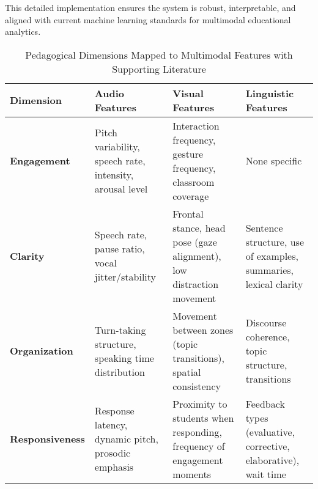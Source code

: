 This detailed implementation ensures the system is robust, interpretable, and aligned with current machine learning standards for multimodal educational analytics.

\sloppy %
\begin{table*}[htbp]
\centering
\renewcommand{\arraystretch}{1.5} %
\setlength{\tabcolsep}{8pt} %
\caption{Pedagogical Dimensions Mapped to Multimodal Features with Supporting Literature}
\begin{tabularx}{\textwidth}{|>{\raggedright\arraybackslash}X|>{\raggedright\arraybackslash}X|>{\raggedright\arraybackslash}X|>{\raggedright\arraybackslash}X|}
\hline
	\textbf{\normalsize Dimension} & \textbf{\normalsize Audio Features} & \textbf{\normalsize Visual Features} & \textbf{\normalsize Linguistic Features} \\
\hline

	\textbf{Engagement} & 
Pitch variability, speech rate, intensity, arousal level \cite{hou2024encouragement, dmello2012multimodal} & 
Interaction frequency, gesture frequency, classroom coverage \cite{mcneill1992hand, ochoa2016multimodal} & 
None specific \cite{hou2024encouragement, dmello2012multimodal} \\
\hline

	\textbf{Clarity} & 
Speech rate, pause ratio, vocal jitter/stability \cite{falcon2024discourse, rowe1986wait} & 
Frontal stance, head pose (gaze alignment), low distraction movement \cite{mcneill1992hand, ochoa2016multimodal} & 
Sentence structure, use of examples, summaries, lexical clarity \cite{falcon2024discourse, rowe1986wait} \\
\hline

	\textbf{Organization} & 
Turn-taking structure, speaking time distribution \cite{ochoa2016multimodal, dmello2012multimodal} & 
Movement between zones (topic transitions), spatial consistency \cite{mcneill1992hand, ochoa2016multimodal} & 
Discourse coherence, topic structure, transitions \cite{ochoa2016multimodal, dmello2012multimodal} \\
\hline

	\textbf{Responsiveness} & 
Response latency, dynamic pitch, prosodic emphasis \cite{rowe1986wait, dmello2012multimodal} & 
Proximity to students when responding, frequency of engagement moments \cite{mcneill1992hand, ochoa2016multimodal} & 
Feedback types (evaluative, corrective, elaborative), wait time \cite{rowe1986wait} \\
\hline


\end{tabularx}
\end{table*}
